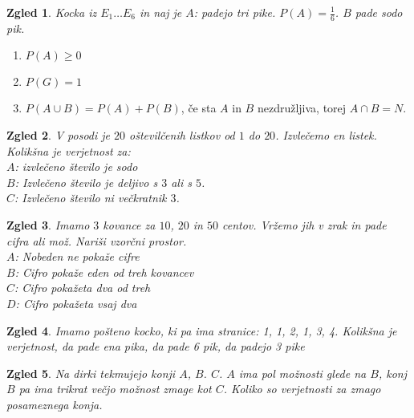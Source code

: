 \documentclass{article}
\newtheorem*{zgled}{Zgled}
\begin{document}
\begin{zgled}
    Kocka iz $E_1 \ldots E_6$ in naj je $A$: padejo tri pike. $P(A)=\frac{1}{6}$. $B$ pade sodo pik.
\end{zgled}

\begin{enumerate}[i]
    \item $P(A)\geq 0$
    \item $P(G)=1$
    \item $P(A\cup B)=P(A)+P(B)$, če sta $A$ in $B$ nezdružljiva, torej $A\cap B=N$.
\end{enumerate}

\begin{zgled}
    V posodi je $20$ oštevilčenih listkov od $1$ do $20$. Izvlečemo en listek. Kolikšna je verjetnost za:\\
    $A$: izvlečeno število je sodo\\
    $B$: Izvlečeno število je deljivo s $3$ ali s $5$.\\
    $C$: Izvlečeno število ni večkratnik $3$.
\end{zgled}

\begin{zgled}
    Imamo $3$ kovance za $10$, $20$ in $50$ centov. Vržemo jih v zrak in pade cifra ali mož. Nariši vzorčni prostor.\\
    $A$: Nobeden ne pokaže cifre\\
    $B$: Cifro pokaže eden od treh kovancev\\
    $C$: Cifro pokažeta dva od treh\\
    $D$: Cifro pokažeta vsaj dva\\
\end{zgled}

\begin{zgled}
    Imamo pošteno kocko, ki pa ima stranice: 1, 1, 2, 1, 3, 4. Kolikšna je verjetnost, da pade ena pika, da pade 6 pik, da padejo 3 pike
\end{zgled}

\begin{zgled}
    Na dirki tekmujejo konji $A$, $B$. $C$. $A$ ima pol možnosti glede na $B$, konj $B$ pa ima trikrat večjo možnost zmage kot $C$. Koliko so verjetnosti za zmago posameznega konja.
\end{zgled}
\end{document}

